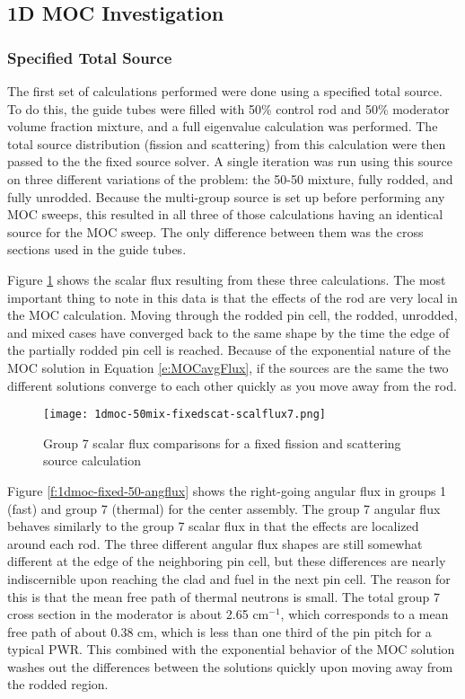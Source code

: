 \subsection{1D MOC Investigation}

\subsubsection{Specified Total Source}

The first set of calculations performed were done using a specified total source.  To do this, the guide tubes were filled with 50\% control rod and 50\% moderator volume fraction mixture, and a full eigenvalue calculation was performed.  The total source distribution (fission and scattering) from this calculation were then passed to the the fixed source solver.  A single iteration was run using this source on three different variations of the problem: the 50-50 mixture, fully rodded, and fully unrodded.  Because the multi-group source is set up before performing any MOC sweeps, this resulted in all three of those calculations having an identical source for the MOC sweep.  The only difference between them was the cross sections used in the guide tubes.

Figure \ref{f:1dmoc-fixed-50-scalflux7} shows the scalar flux resulting from these three calculations.  The most important thing to note in this data is that the effects of the rod are very local in the MOC calculation.  Moving through the rodded pin cell, the rodded, unrodded, and mixed cases have converged back to the same shape by the time the edge of the partially rodded pin cell is reached.  Because of the exponential nature of the MOC solution in Equation \ref{e:MOCavgFlux}, if the sources are the same the two different solutions converge to each other quickly as you move away from the rod.

\begin{figure}[H]
    \centering
    \texttt{[image: 1dmoc-50mix-fixedscat-scalflux7.png]}
    \caption[1D MOC Group 7 Scalar Flux for Fixed Total Source]{Group 7 scalar flux comparisons for a fixed fission and scattering source calculation}\label{f:1dmoc-fixed-50-scalflux7}
\end{figure}

Figure \ref{f:1dmoc-fixed-50-angflux} shows the right-going angular flux in groups 1 (fast) and group 7 (thermal) for the center assembly.  The group 7 angular flux behaves similarly to the group 7 scalar flux in that the effects are localized around each rod.  The three different angular flux shapes are still somewhat different at the edge of the neighboring pin cell, but these differences are nearly indiscernible upon reaching the clad and fuel in the next pin cell.  The reason for this is that the mean free path of thermal neutrons is small.  The total group 7 cross section in the moderator is about 2.65 cm$^{-1}$, which corresponds to a mean free path of about 0.38 cm, which is less than one third of the pin pitch for a typical PWR.  This combined with the exponential behavior of the MOC solution washes out the differences between the solutions quickly upon moving away from the rodded region.

